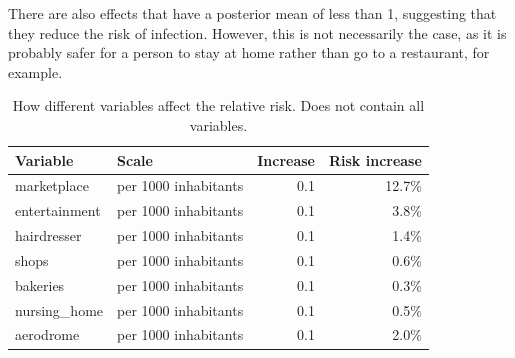 There are also effects that have a posterior mean of less than 1, suggesting that they reduce the risk of infection. However, this is not necessarily the case, as it is probably safer for a person to stay at home rather than go to a restaurant, for example.
\begin{table}[H]
\caption{How different variables affect the relative risk. Does not contain all variables.\label{riskTableGermany}}
\begin{tabular}{l l r r}
\toprule
\textbf{Variable} & \textbf{Scale} & \textbf{Increase} & \textbf{Risk increase} \\
\midrule
marketplace & per 1000 inhabitants & 0.1 & 12.7\% \\
entertainment & per 1000 inhabitants & 0.1 & 3.8\% \\
hairdresser & per 1000 inhabitants & 0.1 & 1.4\% \\
shops & per 1000 inhabitants & 0.1 & 0.6\% \\
bakeries & per 1000 inhabitants & 0.1 & 0.3\% \\
nursing\_home & per 1000 inhabitants & 0.1 & 0.5\% \\
aerodrome & per 1000 inhabitants & 0.1 & 2.0\% \\
\bottomrule
\end{tabular}
\end{table}
